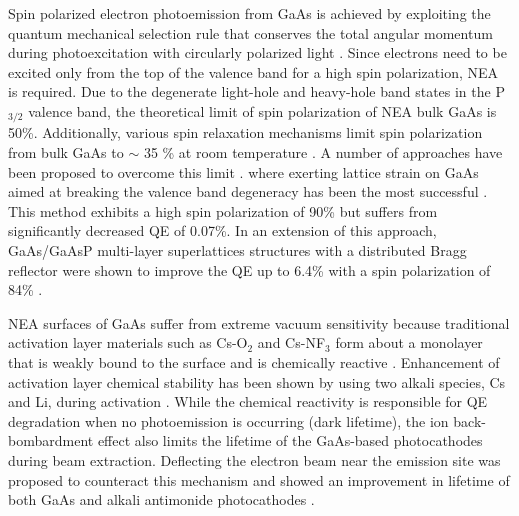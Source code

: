 Spin polarized electron photoemission from GaAs is achieved by exploiting the quantum mechanical selection rule that conserves the total angular momentum during photoexcitation with circularly polarized light \cite{pierce1976}. Since electrons need to be excited only from the top of the valence band for a high spin polarization, NEA is required.
Due to the degenerate light-hole and heavy-hole band states in the P$_{3/2}$ valence band, the theoretical limit of spin polarization of NEA bulk GaAs is 50\%.
Additionally, various spin relaxation mechanisms limit spin polarization from bulk GaAs to $\sim$ 35 \% at room temperature \cite{liu2017_ComprehensiveEvaluationFactors}. A number of approaches have been proposed to overcome this limit \cite{clayburn2013,mccarter2014_MeasurementElectronBeam}. where exerting lattice strain on GaAs aimed at breaking the valence band degeneracy has been the most successful \cite{maruyama1992_ElectronspinPolarizationPhotoemission}. This method exhibits a high spin polarization of 90\% but suffers from significantly decreased QE of 0.07\%. In an extension of this approach, GaAs/GaAsP multi-layer superlattices structures with a distributed Bragg reflector were shown to improve the QE up to 6.4\% with a spin polarization of 84\% \cite{liu2016_RecordlevelQuantumEfficiency}.


NEA surfaces of GaAs suffer from extreme vacuum sensitivity because traditional activation layer materials such as Cs-O$_2$ and Cs-NF$_3$ form about a monolayer that is weakly bound to the surface and is chemically reactive \cite{kuriki2011_DarklifetimeDegradationGaAs,chanlek2014_DegradationQuantumEfficiency}.
 Enhancement of activation layer chemical stability has been shown by using two alkali species, Cs and Li, during activation \cite{mulhollan2008_EnhancedChemicalImmunity,sun2009_SurfaceActivationLayer,kurichiyanil2019test}. 
While the chemical reactivity is responsible for QE degradation when no photoemission is occurring (dark lifetime), the ion back-bombardment effect also limits the lifetime of the GaAs-based photocathodes during beam extraction.
Deflecting the electron beam near the emission site was proposed to counteract this mechanism and showed an improvement in lifetime of both GaAs and alkali antimonide photocathodes 
\cite{grames2011_ChargeFluenceLifetime,mammei2013_ChargeLifetimeMeasurements,rahman2019_IncreasingChargeLifetime,cultrera2011_PhotocathodeBehaviorHigh}.

